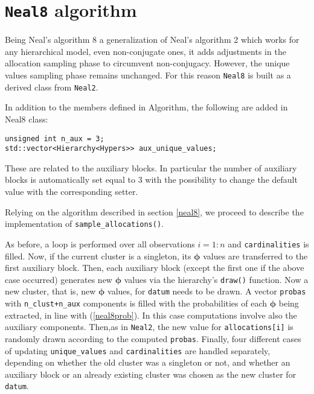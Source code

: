 \section{\texttt{Neal8} algorithm}

Being Neal's algorithm 8 a generalization of Neal's algorithm 2 which works for any hierarchical model, even non-conjugate ones, it adds adjustments in the allocation sampling phase to circumvent non-conjugacy.
However, the unique values sampling phase remains unchanged. For this reason \verb|Neal8| is built as a derived class from \verb|Neal2|.

In addition to the members defined in Algorithm, the following are added in Neal8 class:
\begin{verbatim}
unsigned int n_aux = 3;
std::vector<Hierarchy<Hypers>> aux_unique_values;
\end{verbatim}
These are related to the auxiliary blocks. In particular the number of auxiliary blocks is automatically set equal to 3 with the possibility to change the default value with the corresponding setter.

Relying on the algorithm described in section \ref{neal8}, we proceed to describe the implementation of \verb|sample_allocations()|.

As before, a loop is performed over all observations $i=1:n$ and \verb|cardinalities| is filled. Now, if the current cluster is a singleton, its $\boldsymbol\phi$ values are transferred to the first auxiliary block. Then, each auxiliary block (except the first one if the above case occurred) generates new $\boldsymbol\phi$ values via the hierarchy's \verb|draw()| function. Now a new cluster, that is, new $\boldsymbol\phi$ values, for \verb|datum| needs to be drawn. 	A vector \verb|probas| with \verb|n_clust+n_aux| components is filled with the probabilities of each $\boldsymbol\phi$ being extracted, in line with (\ref{neal8prob}). In this case computations involve also the auxiliary components. Then,as in \verb|Neal2|, the new value for \verb|allocations[i]| is randomly drawn according to the computed \verb|probas|. Finally, four different cases of updating \verb|unique_values| and \verb|cardinalities| are handled separately, depending on whether the old cluster was a singleton or not, and whether an auxiliary block or an already existing cluster was chosen as the new cluster for \verb|datum|.

